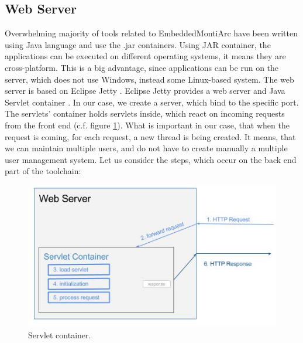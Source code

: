\subsection{Web Server}
Overwhelming majority of tools related to EmbeddedMontiArc have been written using Java language and use the .jar containers. Using JAR container, the applications can be executed on different operating systems, it means they are cross-platform. This is a big advantage, since applications can be run on the server, which does not use Windows, instead some Linux-based system. The web server is based on Eclipse Jetty \cite{Jetty}. Eclipse Jetty provides a web server and Java Servlet container \cite{hunter2001java, coward2003java}. In our case, we create a server, which bind to the specific port. The servlets' container holds servlets inside, which react on incoming requests from the front end (c.f. figure \ref{fig:servlet}). \newline
What is important in our case, that when the request is coming, for each request, a new thread is being created. It means, that we can maintain multiple users, and do not have to create manually a multiple user management system. Let us consider the steps, which occur on the back end part of the toolchain:
\begin{figure}[h!]
    \centering
    \includegraphics[width=0.6\linewidth]{src/pic/servlet-container-life-cycle}
    \caption{Servlet container.}
    \label{fig:servlet}
\end{figure}
